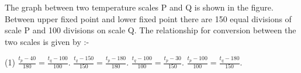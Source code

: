 \item The graph between two temperature scales P and Q is shown in the figure. Between upper fixed point and lower fixed point there are 150 equal divisions of scale P and 100 divisions on scale Q. The relationship for conversion between the two scales is given by :-
    \begin{center}
    \end{center}
    \begin{tasks}(1)
        \task $\frac{t_p - 40}{180} = \frac{t_q - 100}{100}$.
        \task $\frac{t_q - 150}{150} = \frac{t_p - 180}{180}$.
        \task $\frac{t_q - 100}{100} = \frac{t_p - 30}{150}$.
        \task $\frac{t_p - 100}{100} = \frac{t_q - 180}{150}$.
    \end{tasks}